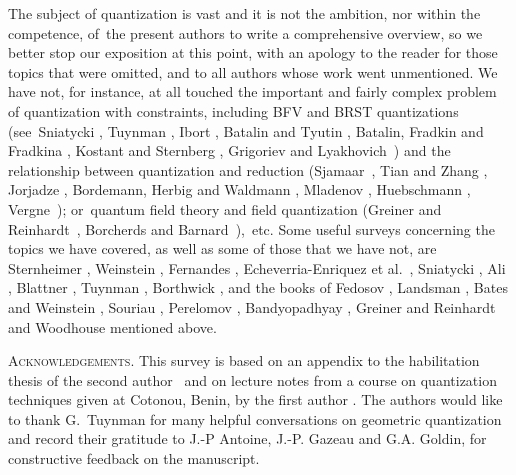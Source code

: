 \documentclass[11pt]{amsart}
\numberwithin{equation}{section}
\theoremstyle{remark}
\begin{document}
   The subject of quantization is vast and it is not the ambition,
nor within the competence, of~the present authors to write a
comprehensive overview, so we better stop our exposition at this
point, with an apology to the reader for those topics that were
omitted, and to all authors whose work went unmentioned. We have
not, for instance, at all touched the important and fairly complex
problem of quantization with constraints, including BFV and BRST
quantizations (see~Sniatycki \cite{bib:SniaCo}, Tuynman
\cite{bib:TuyBRST}, Ibort \cite{bib:Ibort}, Batalin and Tyutin
\cite{bib:BataTyu}, Batalin, Fradkin and Fradkina \cite{bib:BFF},
Kostant and Sternberg \cite{bib:+KoStern}, Grigoriev and
Lyakhovich~\cite{bib:GriLya}) and the relationship between quantization and
reduction (Sjamaar~\cite{bib:+Sjam}, Tian and Zhang \cite{bib:+TiZha}, Jorjadze
\cite{bib:+Jorj}, Bordemann, Herbig and Waldmann \cite{bib:+BoHeWa}, Mladenov
\cite{bib:+Mlad}, Huebschmann \cite{bib:+Hueb}, Vergne~\cite{bib:+Verg});
or~quantum field theory and field quantization (Greiner and
Reinhardt~\cite{bib:GreiRei}, Borcherds and Barnard~\cite{bib:BaBo}),~etc. Some
useful surveys concerning the topics we have  covered, as well as some of those
that we have not, are Sternheimer \cite{bib:Stw}, Weinstein \cite{bib:WeinAst},
Fernandes \cite{bib:Fern}, Echeverria-Enriquez et
al.~\cite{bib:EEMLRRVM}, Sniatycki \cite{bib:SniaA}, Ali
\cite{bib:AliSurv}, Blattner \cite{bib:Blatt}, Tuynman \cite{bib:TuyWis},
Borthwick \cite{bib:+Bwsrv}, and the books of Fedosov \cite{bib:FedosBk},
Landsman \cite{bib:LandsBk}, Bates and Weinstein \cite{bib:BaWei}, Souriau
\cite{bib:SouSD}, Perelomov \cite{bib:Perel}, Bandyopadhyay \cite{bib:+Bandy},
Greiner and Reinhardt \cite{bib:GreiRei} and Woodhouse \cite{bib:Woodh}
mentioned above.

\bigskip

\noindent\textsc{Acknowledgements.} This survey is based on an appendix to the
habilitation thesis of the second author~\cite{bib:EDrSc} and on lecture notes
from a course on quantization techniques given at Cotonou, Benin, by the first
author \cite{bib:AliBen}.
The authors would like to thank G.~Tuynman for many helpful conversations
on geometric quantization and record their gratitude to J.-P Antoine,
J.-P. Gazeau and G.A. Goldin, for constructive feedback on the manuscript.
\end{document}

